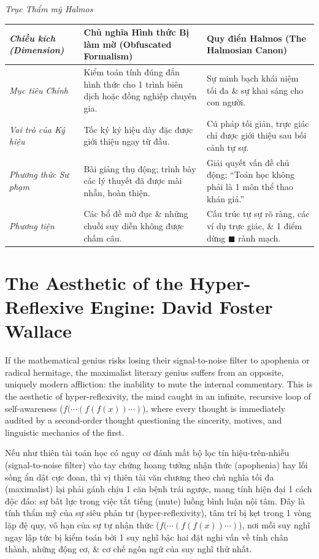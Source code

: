 \documentclass[11pt]{article}
\begin{document}
\emph{Trục Thẩm mỹ Halmos}
\begin{table}[H]
\centering
\begin{tabular}{@{}p{3cm}p{6cm}p{6cm}@{}}
\toprule
\emph{Chiều kích (Dimension)} & \textbf{Chủ nghĩa Hình thức Bị làm mờ (Obfuscated Formalism)} & \textbf{Quy điển Halmos (The Halmosian Canon)} \\
\midrule
\emph{Mục tiêu Chính} & Kiểm toán tính đúng đắn hình thức cho 1 trình biên dịch hoặc đồng nghiệp chuyên gia. & Sự minh bạch khái niệm tối đa \& sự khai sáng cho con người. \\

\emph{Vai trò của Ký hiệu} & Tốc ký ký hiệu dày đặc được giới thiệu ngay từ đầu. & Cú pháp tối giản, trực giác chỉ được giới thiệu sau bối cảnh tự sự. \\

\emph{Phương thức Sư phạm} & Bài giảng thụ động; trình bày các lý thuyết đã được mài nhẵn, hoàn thiện. & Giải quyết vấn đề chủ động; ``Toán học không phải là 1 môn thể thao khán giả.'' \\

\emph{Phương tiện} & Các bổ đề mờ đục \& những chuỗi suy diễn không được chấm câu. & Cấu trúc tự sự rõ ràng, các ví dụ trực giác, \& 1 điểm dừng $\blacksquare$ rành mạch. \\
\bottomrule
\end{tabular}
\end{table}


\section{The Aesthetic of the Hyper-Reflexive Engine: David Foster Wallace}
If the mathematical genius risks losing their signal-to-noise filter to apophenia or radical hermitage, the maximalist literary genius suffers from an opposite, uniquely modern affliction: the inability to mute the internal commentary. This is the aesthetic of hyper-reflexivity, the mind caught in an infinite, recursive loop of self-awareness ($f(\cdots(f(f(x))\cdots)$), where every thought is immediately audited by a second-order thought questioning the sincerity, motives, and linguistic mechanics of the first.

Nếu như thiên tài toán học có nguy cơ đánh mất bộ lọc tín hiệu-trên-nhiễu (signal-to-noise filter) vào tay chứng hoang tưởng nhận thức (apophenia) hay lối sống ẩn dật cực đoan, thì vị thiên tài văn chương theo chủ nghĩa tối đa (maximalist) lại phải gánh chịu 1 căn bệnh trái ngược, mang tính hiện đại 1 cách độc đáo: sự bất lực trong việc tắt tiếng (mute) luồng bình luận nội tâm. Đây là tính thẩm mỹ của sự siêu phản tư (hyper-reflexivity), tâm trí bị kẹt trong 1 vòng lặp đệ quy, vô hạn của sự tự nhận thức ($f(\cdots(f(f(x))\cdots)$), nơi mỗi suy nghĩ ngay lập tức bị kiểm toán bởi 1 suy nghĩ bậc hai đặt nghi vấn về tính chân thành, những động cơ, \& cơ chế ngôn ngữ của suy nghĩ thứ nhất.
\end{document}
